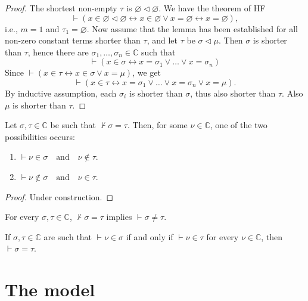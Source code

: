 \begin{proof}
    The shortest non-empty $\tau$ is $\varnothing \lhd \varnothing$. 
    We have the theorem of HF
    $$
    \vdash (x \in \varnothing \lhd \varnothing \leftrightarrow x \in \varnothing \lor x=\varnothing
    \leftrightarrow x=\varnothing),
    $$
    i.e., $m=1$ and $\tau_1 = \varnothing$. 
    Now assume that the lemma has been established for all non-zero constant terms shorter 
    than $\tau$, and let $\tau$ be $\sigma \lhd \mu$. 
    Then $\sigma$ is shorter than $\tau$, 
    hence there are $\sigma_1, \ldots, \sigma_n \in \mathbb{C}$ such that
    $$
    \vdash (x \in \sigma \leftrightarrow x=\sigma_1 \lor \ldots \lor x=\sigma_n)
    $$
    Since $\vdash (x \in \tau \leftrightarrow x \in \sigma \lor x=\mu)$, we get
    $$
    \vdash (x \in \tau \leftrightarrow x=\sigma_1 \lor \ldots \lor x=\sigma_n \lor x=\mu).
    $$
    By inductive assumption, 
    each $\sigma_i$ is shorter than $\sigma$, thus also shorter than $\tau$. 
    Also $\mu$ is shorter than $\tau$.
\end{proof}

\begin{lemma}
    Let $\sigma, \tau \in \mathbb{C}$ be such that $\not\vdash \sigma = \tau$. 
    Then, for some $\nu \in \mathbb{C}$, one of the two possibilities occurs:
    \begin{enumerate}
        \item $\vdash \nu \in \sigma \quad \text{and} \quad \nu \notin \tau$.
        \item $\vdash \nu \notin \sigma \quad \text{and} \quad \nu \in \tau$.
    \end{enumerate}
\end{lemma}

\begin{proof}
    Under construction.
\end{proof}

\begin{corollary}
    For every $\sigma, \tau \in \mathbb{C}$, $\not\vdash \sigma = \tau$ implies 
    $\vdash \sigma \neq \tau$.
\end{corollary}

\begin{corollary}
    If $\sigma, \tau \in \mathbb{C}$ are such that $\vdash \nu \in \sigma$ if and only if
    $\vdash \nu \in \tau$ for every $\nu \in \mathbb{C}$, then $\vdash \sigma = \tau$.
\end{corollary}

\section{The model}


